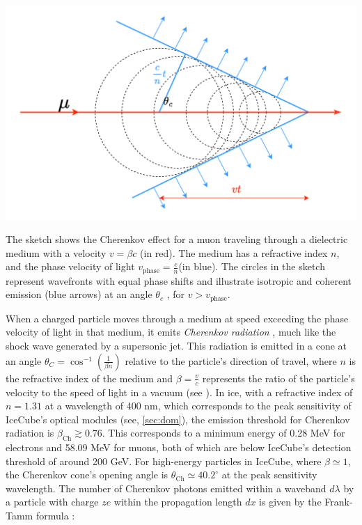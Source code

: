 \begin{marginfigure}
    \includegraphics{./figures/nu_in_icecube/Cherenkov.pdf}
    \caption{The sketch shows the Cherenkov effect for a muon traveling through a dielectric medium with a velocity $v = \beta c$ (in red). The medium has a refractive index $n$, and the phase velocity of light $v_\mathrm{phase} = \frac{c}{n} $(in blue). The circles in the sketch represent wavefronts with equal phase shifts and illustrate isotropic and coherent emission (blue arrows) at an angle $\theta_c$ , for $v>v_\mathrm{phase}$.}
\end{marginfigure}

When a charged particle moves through a medium at speed exceeding the phase velocity of light in that medium, it emits \emph{Cherenkov radiation} , much like the shock wave generated by a supersonic jet. This radiation is emitted in a cone at an angle $\theta_C = \cos^{-1}\left(\frac{1}{\beta n}\right)$ relative to the particle's direction of travel, where $n$ is the refractive index of the medium and $\beta = \frac{v}{c}$ represents the ratio of the particle's velocity to the speed of light in a vacuum (see ). In ice, with a refractive index of $n = 1.31$ at a wavelength of 400 nm, which corresponds to the peak sensitivity of IceCube's optical modules (see, \ref{sec:dom}), the emission threshold for Cherenkov radiation is $\beta_\text{Ch} \gtrsim 0.76$. This corresponds to a minimum energy of 0.28 MeV for electrons and 58.09 MeV for muons, both of which are below IceCube's detection threshold of around 200 GeV. For high-energy particles in IceCube, where $\beta \simeq 1$, the Cherenkov cone's opening angle is $\theta_\text{Ch} \simeq 40.2^\circ$ at the peak sensitivity wavelength. The number of Cherenkov photons emitted within a waveband $d\lambda$ by a particle with charge $ze$ within the propagation length $dx$ is given by the Frank-Tamm formula :

